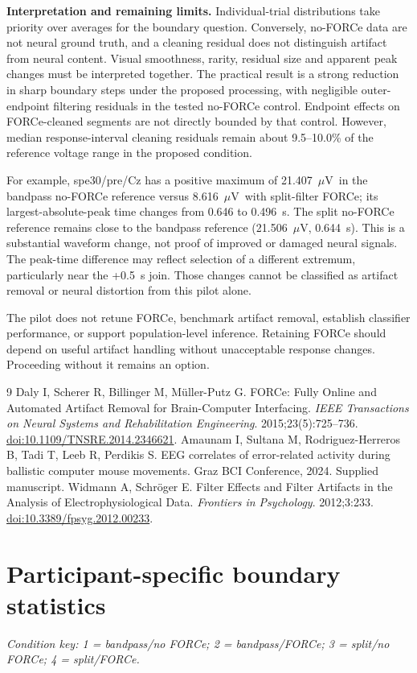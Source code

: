 \documentclass[11pt,a4paper]{article}
\newcommand{\uv}{\ensuremath{\mu\mathrm{V}}}
\begin{document}
\textbf{Interpretation and remaining limits.} Individual-trial distributions take priority over averages for the boundary question. Conversely, no-FORCe data are not neural ground truth, and a cleaning residual does not distinguish artifact from neural content. Visual smoothness, rarity, residual size and apparent peak changes must be interpreted together.
The practical result is a strong reduction in sharp boundary steps under the proposed processing, with negligible outer-endpoint filtering residuals in the tested no-FORCe control. Endpoint effects on FORCe-cleaned segments are not directly bounded by that control. However, median response-interval cleaning residuals remain about 9.5--10.0\% of the reference voltage range in the proposed condition. 

For example, spe30/pre/Cz has a positive maximum of 21.407~\uv\ in the bandpass no-FORCe reference versus 8.616~\uv\ with split-filter FORCe; its largest-absolute-peak time changes from 0.646 to 0.496~s. The split no-FORCe reference remains close to the bandpass reference (21.506~\uv, 0.644~s). This is a substantial waveform change, not proof of improved or damaged neural signals. The peak-time difference may reflect selection of a different extremum, particularly near the +0.5~s join. Those changes cannot be classified as artifact removal or neural distortion from this pilot alone. 

The pilot does not retune FORCe, benchmark artifact removal, establish classifier performance, or support population-level inference. Retaining FORCe should depend on useful artifact handling without unacceptable response changes. Proceeding without it remains an option.
\begin{thebibliography}{9}
 Daly I, Scherer R, Billinger M, M\"uller-Putz G. FORCe: Fully Online and Automated Artifact Removal for Brain-Computer Interfacing. \emph{IEEE Transactions on Neural Systems and Rehabilitation Engineering}. 2015;23(5):725--736. \href{https://doi.org/10.1109/TNSRE.2014.2346621}{doi:10.1109/TNSRE.2014.2346621}.
 Amaunam I, Sultana M, Rodriguez-Herreros B, Tadi T, Leeb R, Perdikis S. EEG correlates of error-related activity during ballistic computer mouse movements. Graz BCI Conference, 2024. Supplied manuscript.
 Widmann A, Schr\"oger E. Filter Effects and Filter Artifacts in the Analysis of Electrophysiological Data. \emph{Frontiers in Psychology}. 2012;3:233. \href{https://doi.org/10.3389/fpsyg.2012.00233}{doi:10.3389/fpsyg.2012.00233}.
\end{thebibliography}
\clearpage\appendix\section{Participant-specific boundary statistics}
\textit{Condition key: 1 = bandpass/no FORCe; 2 = bandpass/FORCe; 3 = split/no FORCe; 4 = split/FORCe.}
\end{document}
